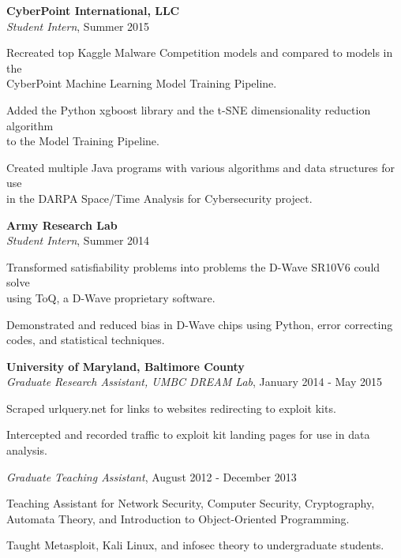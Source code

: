 \medskip
\atab \textbf{CyberPoint International, LLC}\\
\btab \textit{Student Intern}, Summer 2015\\
\begin{my_list}
\item Recreated top Kaggle Malware Competition models and compared to models in the\\ \tab \tab CyberPoint Machine Learning Model Training Pipeline.
\item Added the Python xgboost library and the t-SNE dimensionality reduction algorithm\\ \tab \tab to the Model Training Pipeline.
\item Created multiple Java programs with various algorithms and data structures for use\\ \tab \tab in the DARPA Space/Time Analysis for Cybersecurity project.
\end{my_list}

\medskip
\atab \textbf{Army Research Lab}\\
\btab \textit{Student Intern}, Summer 2014\\
\begin{my_list}
\item Transformed satisfiability problems into problems the D-Wave SR10V6 could solve\\ \tab \tab using ToQ, a D-Wave proprietary software.
\item Demonstrated and reduced bias in D-Wave chips using Python, error correcting\\ \tab \tab codes, and statistical techniques.
\end{my_list}

\medskip
\atab \textbf{University of Maryland, Baltimore County}\\
\btab \textit{Graduate Research Assistant, UMBC DREAM Lab}, January 2014 - May 2015\\
\begin{my_list}
\item Scraped urlquery.net for links to websites redirecting to exploit kits.
\item Intercepted and recorded traffic to exploit kit landing pages for use in data analysis.
\end{my_list}

\btab \textit{Graduate Teaching Assistant}, August 2012 - December 2013\\
\begin{my_list}
\item Teaching Assistant for Network Security, Computer Security, Cryptography,\\ \tab \tab Automata Theory, and Introduction to Object-Oriented Programming.
\item Taught Metasploit, Kali Linux, and infosec theory to undergraduate students.
\end{my_list}

